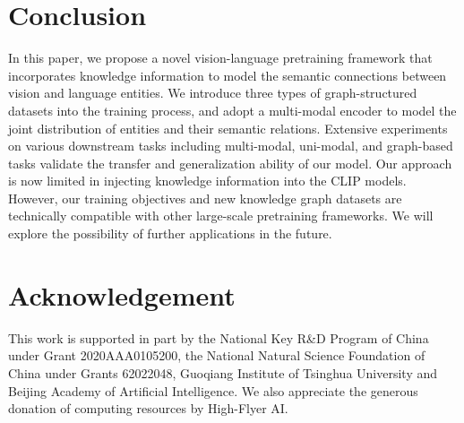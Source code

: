 \section{Conclusion}

\label{sec:conclusion}

In this paper, we propose a novel vision-language pretraining framework that incorporates knowledge information to model the semantic connections between vision and language entities. We introduce three types of graph-structured datasets into the training process, and adopt a multi-modal encoder to model the joint distribution of entities and their semantic relations. Extensive experiments on various downstream tasks including multi-modal, uni-modal, and graph-based tasks validate the transfer and generalization ability of our model. Our approach is now limited in injecting knowledge information into the CLIP models. However, our training objectives and new knowledge graph datasets are technically compatible with other large-scale pretraining frameworks. We will explore the possibility of further applications in the future.


\section{Acknowledgement}
This work is supported in part by the National Key R\&D Program of China under Grant 2020AAA0105200, the National Natural Science Foundation of China under Grants 62022048, Guoqiang Institute of Tsinghua University and Beijing Academy of Artificial Intelligence. We also appreciate the generous donation of computing resources by High-Flyer AI.